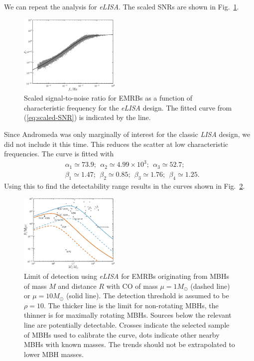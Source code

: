 \documentclass[useAMS,usedcolumn,usegraphicx,usenatbib]{mn2e}
\newcommand{\eqnref}[1]{(\ref{eq:#1})}
\newcommand{\figref}[1]{Fig.~\ref{fig:#1}}
\begin{document}
We can repeat the analysis for \textit{eLISA}. The scaled SNRs are shown in \figref{scaled-SNR-eLISA}.
\begin{figure}
\begin{center}
 \includegraphics[width=0.43\textwidth]{Fig_SNR_scaled_fit_eLISA}
 \caption{Scaled signal-to-noise ratio for EMRBs as a function of characteristic frequency for the \textit{eLISA} design. The fitted curve from \eqnref{scaled-SNR} is indicated by the line.\label{fig:scaled-SNR-eLISA}}
   \end{center}
\end{figure}
Since Andromeda was only marginally of interest for the classic \textit{LISA} design, we did not include it this time. This reduces the scatter at low characteristic frequencies. The curve is fitted with
\begin{equation}
\begin{split}
&\alpha_1 \simeq 73.9; \ \ \alpha_2 \simeq 4.99 \times 10^3; \ \ \alpha_3 \simeq 52.7;\\
&\beta_1 \simeq 1.47; \ \ \beta_2 \simeq 0.85; \ \ \beta_3 \simeq 1.76; \ \ \beta_4 \simeq 1.25.
\end{split}
\end{equation}
Using this to find the detectability range results in the curves shown in \figref{detect-eLISA}.
\begin{figure}
\begin{center}
 \includegraphics[width=0.43\textwidth]{Fig_M_R_detect_2}
 \caption{Limit of detection using \textit{eLISA} for EMRBs originating from MBHs of mass $M$ and distance $R$ with CO of mass $\mu = 1 M_\odot$ (dashed line) or $\mu = 10 M_\odot$ (solid line). The detection threshold is assumed to be $\rho = 10$. The thicker line is the limit for non-rotating MBHs, the thinner is for maximally rotating MBHs. Sources below the relevant line are potentially detectable. Crosses indicate the selected sample of MBHs used to calibrate the curve, dots indicate other nearby MBHs with known masses. The trends should not be extrapolated to lower MBH masses.\label{fig:detect-eLISA}}
   \end{center}
\end{figure}
\end{document}
